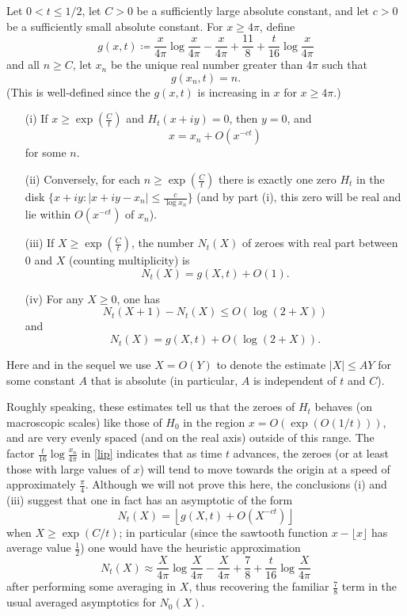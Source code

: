 \begin{theorem}\label{Zero}  Let $0 < t \leq 1/2$, let $C>0$ be a sufficiently large absolute constant, and let $c>0$ be a sufficiently small absolute constant.  For $x \geq 4\pi$, define
$$ g(x,t) \coloneqq  \frac{x}{4\pi} \log \frac{x}{4\pi} - \frac{x}{4\pi} + \frac{11}{8} + \frac{t}{16} \log \frac{x}{4\pi} $$
and all $n \geq C$, let $x_n$ be the unique real number greater than $4\pi$ such that
\begin{equation}\label{lip}
 g(x_n,t) = n.
\end{equation}
(This is well-defined since the $g(x,t)$ is increasing in $x$ for $x \geq 4\pi$.)
\begin{itemize}
\item[(i)]  If $x \geq \exp(\frac{C}{t})$ and $H_t(x+iy)=0$, then $y=0$, and
$$ x = x_n + O(x^{-ct})$$
for some $n$.  
\item[(ii)]  Conversely, for each $n \geq \exp( \frac{C}{t} )$ there is exactly one zero $H_t$ in the disk $\{ x+iy: |x+iy - x_n| \leq \frac{c}{\log x_n} \}$ (and by part (i), this zero will be real and lie within $O(x^{-ct})$ of $x_n$).
\item[(iii)]  If $X \geq \exp(\frac{C}{t})$, the number $N_t(X)$ of zeroes with real part between $0$ and $X$ (counting multiplicity) is
$$ N_t(X) = g(X,t) + O(1).$$
\item[(iv)]  For any $X \geq 0$, one has
$$ N_t(X+1) - N_t(X) \leq O( \log(2+X) )$$
and
$$ N_t(X) = g(X,t) + O( \log(2+X) ).$$
\end{itemize}
Here and in the sequel we use $X = O(Y)$ to denote the estimate $|X| \leq AY$ for some constant $A$ that is absolute (in particular, $A$ is independent of $t$ and $C$).
\end{theorem}

Roughly speaking, these estimates tell us that the zeroes of $H_t$ behaves (on macroscopic scales) like those of $H_0$ in the region $x = O(\exp(O(1/t)))$, and are very evenly spaced (and on the real axis) outside of this range.  The factor $\frac{t}{16} \log \frac{x_n}{4\pi}$ in \eqref{lip} indicates that as time $t$ advances, the zeroes (or at least those with large values of $x$) will tend to move towards the origin at a speed of approximately $\frac{\pi}{4}$.  Although we will not prove this here, the conclusions (i) and (iii) suggest that one in fact has an asymptotic of the form
$$ N_t(X) = \left\lfloor g(X,t) + O( X^{-ct} ) \right\rfloor$$
when $X \geq \exp(C/t)$; in particular (since the sawtooth function $x - \lfloor x \rfloor$ has average value $\frac{1}{2}$) one would have the heuristic approximation
$$ N_t(X) \approx \frac{X}{4\pi} \log \frac{X}{4\pi} - \frac{X}{4\pi} + \frac{7}{8} + \frac{t}{16} \log \frac{X}{4\pi} $$
 after performing some averaging in $X$, thus recovering the familiar $\frac{7}{8}$ term in the usual averaged asymptotics for $N_0(X)$.

